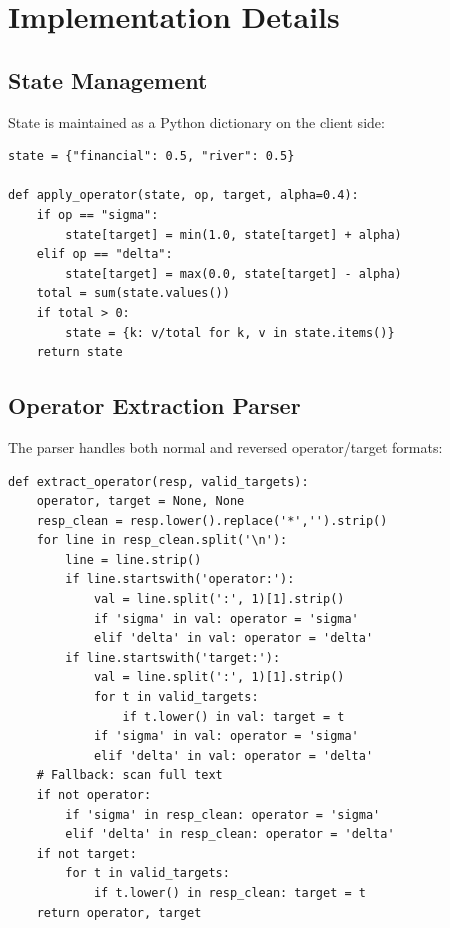 \documentclass[11pt,a4paper]{article}
\begin{document}
\appendix

\section{Implementation Details}
\label{app:implementation}

\subsection{State Management}

State is maintained as a Python dictionary on the client side:

\begin{lstlisting}
state = {"financial": 0.5, "river": 0.5}

def apply_operator(state, op, target, alpha=0.4):
    if op == "sigma":
        state[target] = min(1.0, state[target] + alpha)
    elif op == "delta":
        state[target] = max(0.0, state[target] - alpha)
    total = sum(state.values())
    if total > 0:
        state = {k: v/total for k, v in state.items()}
    return state
\end{lstlisting}

\subsection{Operator Extraction Parser}

The parser handles both normal and reversed operator/target formats:

\begin{lstlisting}
def extract_operator(resp, valid_targets):
    operator, target = None, None
    resp_clean = resp.lower().replace('*','').strip()
    for line in resp_clean.split('\n'):
        line = line.strip()
        if line.startswith('operator:'):
            val = line.split(':', 1)[1].strip()
            if 'sigma' in val: operator = 'sigma'
            elif 'delta' in val: operator = 'delta'
        if line.startswith('target:'):
            val = line.split(':', 1)[1].strip()
            for t in valid_targets:
                if t.lower() in val: target = t
            if 'sigma' in val: operator = 'sigma'
            elif 'delta' in val: operator = 'delta'
    # Fallback: scan full text
    if not operator:
        if 'sigma' in resp_clean: operator = 'sigma'
        elif 'delta' in resp_clean: operator = 'delta'
    if not target:
        for t in valid_targets:
            if t.lower() in resp_clean: target = t
    return operator, target
\end{lstlisting}
\end{document}
